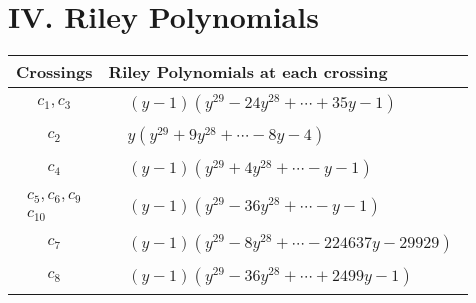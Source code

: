 \documentclass[1p]{elsarticle_modified}
\theoremstyle{definition}
\begin{document}
\centering \section*{ IV. Riley Polynomials}
\begin{tabular}{m{50pt}|m{274pt}}
Crossings & \hspace{64pt}Riley Polynomials at each crossing \\
\hline $$\begin{aligned}c_{1},c_{3}\end{aligned}$$&$\begin{aligned}
&(y-1)(y^{29}-24 y^{28}+\cdots+35 y-1)
\end{aligned}$\\
\hline $$\begin{aligned}c_{2}\end{aligned}$$&$\begin{aligned}
&y(y^{29}+9 y^{28}+\cdots-8 y-4)
\end{aligned}$\\
\hline $$\begin{aligned}c_{4}\end{aligned}$$&$\begin{aligned}
&(y-1)(y^{29}+4 y^{28}+\cdots- y-1)
\end{aligned}$\\
\hline $$\begin{aligned}c_{5},c_{6},c_{9}\\c_{10}\end{aligned}$$&$\begin{aligned}
&(y-1)(y^{29}-36 y^{28}+\cdots- y-1)
\end{aligned}$\\
\hline $$\begin{aligned}c_{7}\end{aligned}$$&$\begin{aligned}
&(y-1)(y^{29}-8 y^{28}+\cdots-224637 y-29929)
\end{aligned}$\\
\hline $$\begin{aligned}c_{8}\end{aligned}$$&$\begin{aligned}
&(y-1)(y^{29}-36 y^{28}+\cdots+2499 y-1)
\end{aligned}$\\
\hline
\end{tabular}
\vskip 2pc
\end{document}
